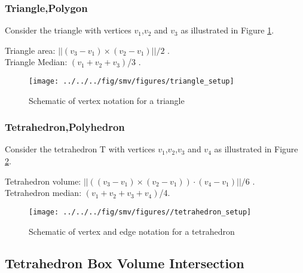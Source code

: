 \documentclass[12pt]{article}
\begin{document}
\subsubsection{Triangle,Polygon}
Consider the triangle with vertices $v_1$,$v_2$ and $v_3$ as illustrated in Figure \ref{figure:triangle_setup}.

\noindent Triangle area: $||(v_3-v_1)\times (v_2-v_1)||/2$ . \\
Triangle Median: $(v_1+v_2+v_3)$/3 .

\begin{figure}
\begin{center}
\texttt{[image: ../../../fig/smv/figures/triangle\_setup]}
\end{center}
\caption{Schematic of vertex notation for a triangle}
\label{figure:triangle_setup}
\end{figure}

\subsubsection{Tetrahedron,Polyhedron}
Consider the tetrahedron T with vertices $v_1$,$v_2$,$v_3$ and $v_4$ as illustrated in Figure \ref{figure:tetrahedron_setup}.

\noindent Tetrahedron volume: $||((v_3-v_1)\times (v_2-v_1))\cdot (v_4-v_1)||/6$ .\\
Tetrahedron median: $(v_1+v_2+v_3+v_4)$/4.

\begin{figure}
\begin{center}
\texttt{[image: ../../../fig/smv/figures//tetrahedron\_setup]}
\end{center}
\caption{Schematic of vertex and edge notation for a tetrahedron}
\label{figure:tetrahedron_setup}
\end{figure}


\newcommand{\tetra}{\mbox{tetra\_bounds}}
\newcommand{\bbox}{\mbox{box\_bounds}}
\newcommand{\txtmin}{\mbox{min}}
\newcommand{\txtmax}{\mbox{max}}
\subsection{Tetrahedron Box Volume Intersection}
\end{document}

